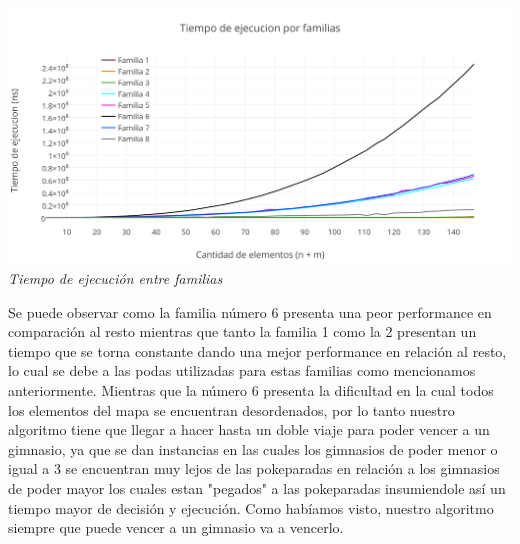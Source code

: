 \vspace*{0.3cm} \vspace*{0.3cm}
  \begin{center}
\includegraphics[scale=0.60]{./EJ2/comparativo.png}
\\{\textit{Tiempo de ejecución entre familias}}
  \end{center}
  \vspace*{0.3cm}
  \begin{figure} [!ht]
 \centering
    \label{fig:comparativo1}
    \label{fig:comparativo2}
    \end{figure}
  
Se puede observar como la familia n\'umero 6 presenta una peor performance en comparaci\'on al resto mientras que tanto la familia 1 como la 2 presentan un tiempo que se torna constante dando una mejor performance en relaci\'on al resto, lo cual se debe a las podas utilizadas para estas familias como mencionamos anteriormente. Mientras que la n\'umero 6 presenta la dificultad en la cual todos los elementos del mapa se encuentran desordenados, por lo tanto nuestro algoritmo tiene que llegar a hacer hasta un doble viaje para poder vencer a un gimnasio, ya que se dan instancias en las cuales los gimnasios de poder menor o igual a 3 se encuentran muy lejos de las pokeparadas en relaci\'on a los gimnasios de poder mayor los cuales estan "pegados" a las pokeparadas insumiendole as\'i un tiempo mayor de decisi\'on y ejecuci\'on. Como hab\'iamos visto, nuestro algoritmo siempre que puede vencer a un gimnasio va a vencerlo.

